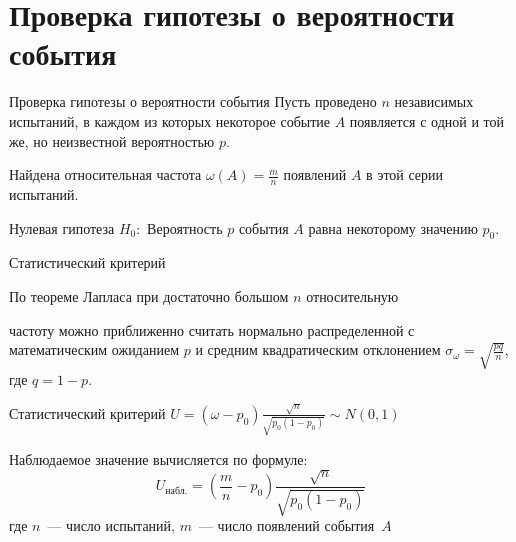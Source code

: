 \documentclass[unicode,11pt,notheorems,xcolor=table]{beamer}
\begin{document}
\section{Проверка гипотезы о вероятности события}
\begin{frame}{Проверка гипотезы о вероятности события}{}
    Пусть проведено $n$ независимых испытаний, в каждом из которых некоторое событие $A$ появляется с одной и той же, но неизвестной вероятностью $p$.
    
    \bigskip
    Найдена относительная частота $\omega(A)=\frac{m}{n}$ появлений $A$ в этой серии испытаний. 

    \bigskip
    
    \begin{block}{Нулевая гипотеза }
        $H_0\colon$ Вероятность $p$ события $A$ равна некоторому значению $p_0$.
    \end{block}

\end{frame}

\begin{frame}{Статистический критерий}{}

 
    {\small По теореме Лапласа при достаточно большом $n$ относительную
 
    частоту можно приближенно считать нормально распределенной с математическим ожиданием $p$ и средним квадратическим
    отклонением  $\sigma_\omega = \sqrt{\frac{pq}{n}}$, где $q=1-p$. 
    \par}
    
    \bigskip

    \begin{block}{Статистический критерий}
        \centering
        $ \displaystyle
            U=\left(\omega-p_0\right)\frac{\sqrt{n}}{\sqrt{p_0(1-p_0)}} \sim N(0,1)
        $
    \end{block}

    \bigskip
    Наблюдаемое значение вычисляется по формуле:
    $$
        U_\text{набл.}=\left(\frac{m}{n}-p_0\right)\frac{\sqrt{n}}{\sqrt{p_0(1-p_0)}}
    $$
    где $n$~--- число испытаний, $m$~--- число появлений события~$A$

 
\end{frame}
\end{document}
